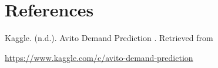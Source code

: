 \documentclass{article}
\begin{document}
	\pagebreak

\section{References}

Kaggle. (n.d.). Avito Demand Prediction . Retrieved from 

\url{https://www.kaggle.com/c/avito-demand-prediction}
\end{document}
